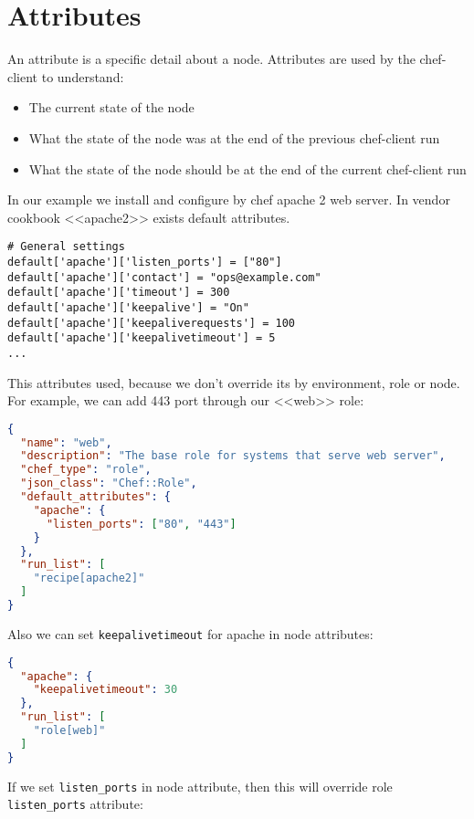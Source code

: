\section{Attributes}
\label{sec:solo-attributes}

An attribute is a specific detail about a node. Attributes are used by the chef-client to understand:

\begin{itemize}
  \item The current state of the node
  \item What the state of the node was at the end of the previous chef-client run
  \item What the state of the node should be at the end of the current chef-client run
\end{itemize}

In our example we install and configure by chef apache 2 web server. In vendor cookbook <<apache2>> exists default attributes.

\begin{lstlisting}[label=lst:my-cloud-attributes1]
# General settings
default['apache']['listen_ports'] = ["80"]
default['apache']['contact'] = "ops@example.com"
default['apache']['timeout'] = 300
default['apache']['keepalive'] = "On"
default['apache']['keepaliverequests'] = 100
default['apache']['keepalivetimeout'] = 5
...
\end{lstlisting}

This attributes used, because we don't override its by environment, role or node. For example, we can add 443 port through our <<web>> role:

\begin{lstlisting}[language=JSON,label=lst:my-cloud-attributes2]
{
  "name": "web",
  "description": "The base role for systems that serve web server",
  "chef_type": "role",
  "json_class": "Chef::Role",
  "default_attributes": {
    "apache": {
      "listen_ports": ["80", "443"]
    }
  },
  "run_list": [
    "recipe[apache2]"
  ]
}
\end{lstlisting}

Also we can set \lstinline!keepalivetimeout! for apache in node attributes:

\begin{lstlisting}[language=JSON,label=lst:my-cloud-attributes3]
{
  "apache": {
    "keepalivetimeout": 30
  },
  "run_list": [
    "role[web]"
  ]
}
\end{lstlisting}

If we set \lstinline!listen_ports! in node attribute, then this will override role \lstinline!listen_ports! attribute:

